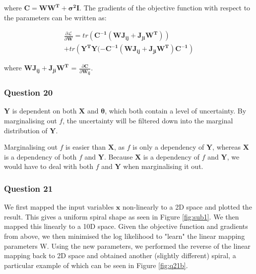 \documentclass[10pt, a4paper, twocolumn]{article} %
\begin{document}
where $\mathbf{C} = \mathbf{WW^T} + \bm{\sigma^2}\mathbf{I}$. The gradients of the objective function with respect to the parameters can be written as:

\begin{multline}
  \frac{\partial \mathcal{L}}{\partial \mathbf{W}} = tr(\mathbf{C^{-1}(WJ_{ij} +  J_{ji}W^T)}) \\
  + tr(\mathbf{Y^TY(-C^{-1}(WJ_{ij} +  J_{ji}W^T)C^{-1}})
\end{multline}

where $\mathbf{WJ_{ij} +  J_{ji}W^T}$ = $\frac{\partial \mathbf{C}}{\partial \mathbf{W_{ij}}}$.

\subsubsection*{Question 20}
$\mathbf{Y}$ is dependent on both $\mathbf{X}$ and $\mathbf{\theta}$, which both contain a level of uncertainty. By marginalising out $f$, the uncertainty will be filtered down into the marginal distribution of $\mathbf{Y}$. 
\par
Marginalising out $f$ is easier than $\mathbf{X}$, as $f$ is only a dependency of $\mathbf{Y}$, whereas $\mathbf{X}$ is a dependency of both $f$ and $\mathbf{Y}$.
Because $\mathbf{X}$ is a dependency of $f$ and $\mathbf{Y}$, we would have to deal with both $f$ and $\mathbf{Y}$ when marginalising it out. 





\subsubsection*{Question 21}

We first mapped the input variables $\mathbf{x}$ non-linearly to a 2D space and plotted the result. This gives a uniform spiral shape as seen in Figure \ref{fig:sub1}. We then mapped this linearly to a 10D space. Given the objective function and gradients from above, we then minimised the log likelihood to "learn" the linear mapping parameters W. Using the new parameters, we performed the reverse of the linear mapping back to 2D space and obtained another (slightly different) spiral, a particular example of which can be seen in Figure \ref{fig:q21b}.
\end{document}
